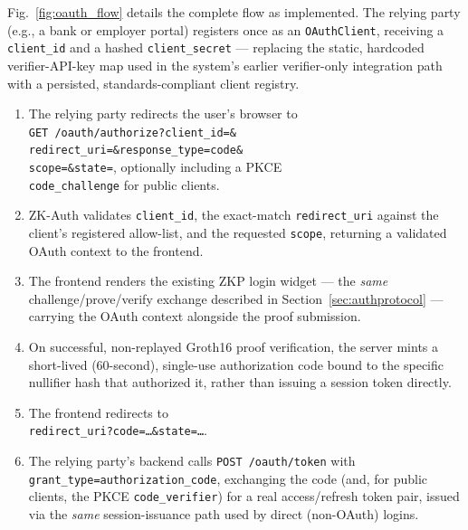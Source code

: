 \documentclass[12pt,a4paper,oneside]{report}
\begin{document}
Fig.~\ref{fig:oauth_flow} details the complete flow as implemented.
The relying party (e.g., a bank or employer portal) registers once as
an \texttt{OAuthClient}, receiving a \texttt{client\_id} and a hashed
\texttt{client\_secret} --- replacing the static, hardcoded
verifier-API-key map used in the system's earlier verifier-only
integration path with a persisted, standards-compliant client registry.

\begin{enumerate}
  \item The relying party redirects the user's browser to\\
        \texttt{GET /oauth/authorize?client\_id=\&}\\
        \texttt{redirect\_uri=\&response\_type=code\&}\\
        \texttt{scope=\&state=}, optionally
        including a PKCE\\ \texttt{code\_challenge} for public clients.
  \item ZK-Auth validates \texttt{client\_id}, the exact-match
        \texttt{redirect\_uri} against the client's registered
        allow-list, and the requested \texttt{scope}, returning a
        validated OAuth context to the frontend.
  \item The frontend renders the existing ZKP login widget --- the
        \textit{same} challenge/prove/verify exchange described in
        Section~\ref{sec:authprotocol} --- carrying the OAuth context
        alongside the proof submission.
  \item On successful, non-replayed Groth16 proof verification, the
        server mints a short-lived (60-second), single-use
        authorization code bound to the specific nullifier hash that
        authorized it, rather than issuing a session token directly.
  \item The frontend redirects to\\
        \texttt{redirect\_uri?code=\dots\&state=\dots}.
  \item The relying party's backend calls \texttt{POST /oauth/token} with\\
        \texttt{grant\_type=authorization\_code}, exchanging the code
        (and, for public clients, the PKCE \texttt{code\_verifier})
        for a real access/refresh token pair, issued via the
        \textit{same} session-issuance path used by direct
        (non-OAuth) logins.
\end{enumerate}
\end{document}
